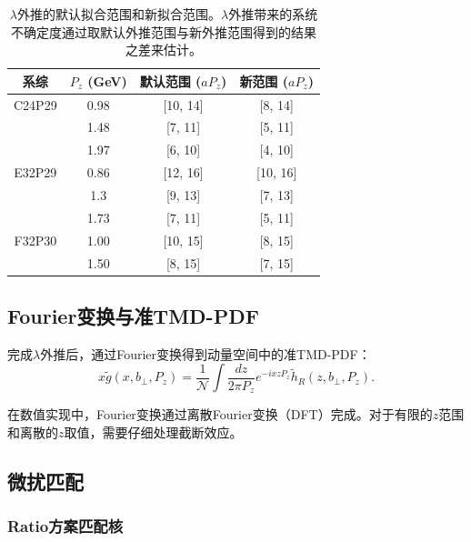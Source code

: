 \documentclass[12pt,a4paper]{ctexart}
\theoremstyle{definition}
\newcommand{\hR}{\tilde{h}_R}
\newcommand{\Pz}{P_z}
\newcommand{\bperp}{b_\perp}
\begin{document}
\begin{table}[H]
\centering
\caption{$\lambda$外推的默认拟合范围和新拟合范围。$\lambda$外推带来的系统不确定度通过取默认外推范围与新外推范围得到的结果之差来估计。}
\label{tab:lambda_fit}
\begin{tabular}{cccc}
\toprule
系综 & $P_z$ (GeV) & 默认范围 ($aP_z$) & 新范围 ($aP_z$) \\
\midrule
C24P29 & 0.98 & [10, 14] & [8, 14] \\
        & 1.48 & [7, 11]  & [5, 11] \\
        & 1.97 & [6, 10]  & [4, 10] \\
\midrule
E32P29 & 0.86 & [12, 16] & [10, 16] \\
        & 1.3  & [9, 13]  & [7, 13] \\
        & 1.73 & [7, 11]  & [5, 11] \\
\midrule
F32P30 & 1.00 & [10, 15] & [8, 15] \\
        & 1.50 & [8, 15]  & [7, 15] \\
\bottomrule
\end{tabular}
\end{table}

\subsection{Fourier变换与准TMD-PDF}

完成$\lambda$外推后，通过Fourier变换得到动量空间中的准TMD-PDF：
\begin{equation}\label{eq:quasi_tmd_fourier}
    x\tilde{g}(x, \bperp, \Pz) = \frac{1}{\mathcal{N}} \int \frac{dz}{2\pi\Pz} e^{-ixz\Pz} \hR(z, \bperp, \Pz).
\end{equation}

在数值实现中，Fourier变换通过离散Fourier变换（DFT）完成。对于有限的$z$范围和离散的$z$取值，需要仔细处理截断效应。

\subsection{微扰匹配}

\subsubsection{Ratio方案匹配核}
\end{document}
